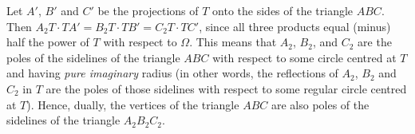 \documentclass[a4paper, 12pt]{article}
\begin{document}
\begin{enumerate}
Let $A'$, $B'$ and $C'$ be the projections of $T$ onto the sides of the triangle $ABC$. Then $A_2 T \cdot T A' = B_2 T \cdot TB' = C_2 T \cdot TC'$, since all three products equal (minus) half the power of $T$ with respect to $\Omega$. This means that $A_2$, $B_2$, and $C_2$ are the poles of the sidelines of the triangle $ABC$ with respect to some circle centred at $T$ and having \textit{pure imaginary} radius (in other words, the reflections of $A_2$, $B_2$ and $C_2$ in $T$ are the poles of those sidelines with respect to some regular circle centred at $T$). Hence, dually, the vertices of the triangle $ABC$ are also poles of the sidelines of the triangle $A_2 B_2 C_2$.

\vspace{6mm}


    

\end{enumerate}
\end{document}
